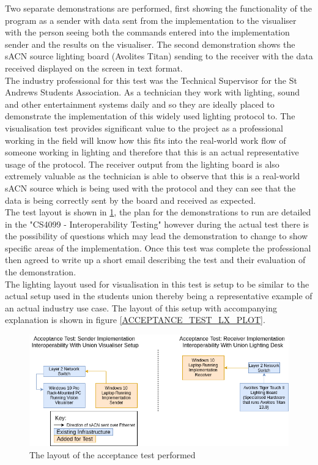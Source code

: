 \documentclass[11pt,a4paper]{report}
\begin{document}
Two separate demonstrations are performed, first showing the functionality of the program as a sender with data sent from the implementation to the visualiser with the person seeing both the commands entered into the implementation sender and the results on the visualiser. The second demonstration shows the sACN source lighting board (Avolites Titan) sending to the receiver with the data received displayed on the screen in text format. \\

The industry professional for this test was the Technical Supervisor for the St Andrews Students Association. As a technician they work with lighting, sound and other entertainment systems daily and so they are ideally placed to demonstrate the implementation of this widely used lighting protocol to. The visualisation test provides significant value to the project as a professional working in the field will know how this fits into the real-world work flow of someone working in lighting and therefore that this is an actual representative usage of the protocol. The receiver output from the lighting board is also extremely valuable as the technician is able to observe that this is a real-world sACN source which is being used with the protocol and they can see that the data is being correctly sent by the board and received as expected.  \\

The test layout is shown in \ref{ACCEPTANCE_TEST_LAYOUT}, the plan for the demonstrations to run are detailed in the "CS4099 - Interoperability Testing" however during the actual test there is the possibility of questions which may lead the demonstration to change to show specific areas of the implementation. Once this test was complete the professional then agreed to write up a short email describing the test and their evaluation of the demonstration.\\ 

The lighting layout used for visualisation in this test is setup to be similar to the actual setup used in the students union thereby being a representative example of an actual industry use case. The layout of this setup with accompanying explanation is shown in figure \ref{ACCEPTANCE_TEST_LX_PLOT}. 

\begin{figure}[H]
	\label{ACCEPTANCE_TEST_LAYOUT}
	\includegraphics[width=\textwidth]{CS4099-Acceptance-Test-Layout.png}
	\caption{The layout of the acceptance test performed}
\end{figure}
\end{document}
